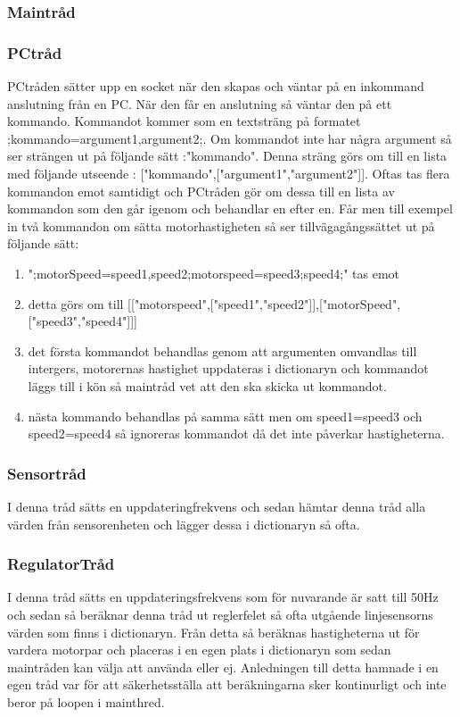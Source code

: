\subsubsection{Maintråd}
\subsubsection{PCtråd}
PCtråden sätter upp en socket när den skapas och väntar på en inkommand anslutning från en PC. När den får en anslutning så väntar den på ett kommando. Kommandot kommer som en textsträng på formatet ;kommando=argument1,argument2;. Om kommandot inte har några argument så ser strängen ut på följande sätt :"kommando". Denna sträng görs om till en lista med följande utseende : ["kommando",["argument1","argument2"]].
\newline
\newline
Oftas tas flera kommandon emot samtidigt och PCtråden gör om dessa till en lista av kommandon som den går igenom och behandlar en efter en. Får men till exempel in två kommandon om sätta motorhastigheten så ser tillvägagångssättet ut på följande sätt:
\begin{enumerate}
\item ";motorSpeed=speed1,speed2;motorspeed=speed3;speed4;"  tas emot
\item detta görs om till [["motorspeed",["speed1","speed2"]],["motorSpeed",["speed3","speed4"]]]
\item det första kommandot behandlas genom att argumenten omvandlas till intergers, motorernas hastighet uppdateras i dictionaryn och kommandot läggs till i kön så maintråd vet att den ska skicka ut kommandot.
\item nästa kommando behandlas på samma sätt men om speed1=speed3 och speed2=speed4 så ignoreras kommandot då det inte påverkar hastigheterna. 
\end{enumerate}
\subsubsection{Sensortråd}
I denna tråd sätts en uppdateringfrekvens och sedan hämtar denna tråd alla värden från sensorenheten och lägger dessa i dictionaryn så ofta.
\subsubsection{RegulatorTråd}
I denna tråd sätts en uppdateringsfrekvens som för nuvarande är satt till 50Hz och sedan så beräknar denna tråd ut reglerfelet så ofta utgående linjesensorns värden som finns i dictionaryn. Från detta så beräknas hastigheterna ut för vardera motorpar och placeras i en egen plats i dictionaryn som sedan maintråden kan välja att använda eller ej. 
\newline
\newline
Anledningen till detta hamnade i en egen tråd var för att säkerhetsställa att beräkningarna sker kontinurligt och inte beror på loopen i mainthred. 




